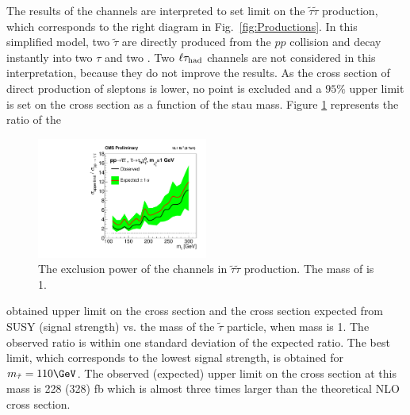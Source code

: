 The results of the \tauTau channels are interpreted to set limit on the $\tilde{\tau}\tilde{\tau}$ production, 
which corresponds to the right diagram in Fig.~\ref{fig:Productions}. 
In this simplified model, two $\tilde{\tau}$ are directly produced from the $pp$ collision and decay instantly 
into two $\tau$ and two \PSGczDo. Two $\ell\tau_{\rm had}$ channels are not considered in this interpretation, because they do not improve the results. 
As the cross section of direct production of sleptons is lower, no point is excluded and a $95\%$ upper limit is set on 
the cross section  as a function of the stau mass. 
Figure \ref{fig:limit_stau_stau} represents the ratio of the 
\begin{linenomath}
\begin{figure}[!Hhtb]
\centering
\includegraphics[width=0.5\textwidth,keepaspectratio=true]{StatisticsFig/ExclusionSTauSTauLsp1.pdf}
\caption{The exclusion power of the \tauTau channels in $\tilde{\tau}\tilde{\tau}$ production. The mass of \PSGczDo is 1\GeV.}
\label{fig:limit_stau_stau}
\end{figure}
\end{linenomath}
obtained upper limit on the cross section and the cross section expected from SUSY (signal strength) vs. the mass of the $\tilde{\tau}$ particle, when \PSGczDo mass is 1\GeV.
The observed ratio is within one standard deviation of  the expected ratio.
The best limit, which corresponds to the lowest signal strength, is obtained for $m_{\tilde{\tau}}=110\GeV$. The observed (expected) upper limit on the cross section at this mass is 228 (328) fb which is almost three times larger than the theoretical NLO cross section.



